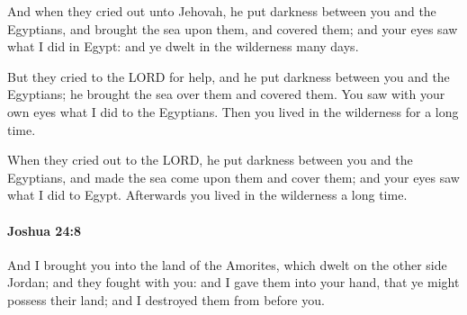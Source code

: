 			\begin{versebox}
					\item[BHS] 
					\item[ASV] And when they cried out unto Jehovah, he put darkness between you and the Egyptians, and brought the sea upon them, and covered them; and your eyes saw what I did in Egypt: and ye dwelt in the wilderness many days.
					\item[NIV] But they cried to the LORD for help, and he put darkness between you and the Egyptians; he brought the sea over them and covered them. You saw with your own eyes what I did to the Egyptians. Then you lived in the wilderness for a long time.
					\item[NRSV] When they cried out to the LORD, he put darkness between you and the Egyptians, and made the sea come upon them and cover them; and your eyes saw what I did to Egypt. Afterwards you lived in the wilderness a long time.
			\end{versebox}

		\paragraph{Joshua 24:8} %
			\label{JOSHUA-24-8}

			And I brought you into the land of the Amorites, which dwelt on the other side Jordan; and they fought with you: and I gave them into your hand, that ye might possess their land; and I destroyed them from before you.

